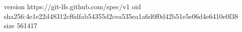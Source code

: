 version https://git-lfs.github.com/spec/v1
oid sha256:4e1e22d48312cf6dfab54355d2cea535ea1a6d0f0d42b51e5e06d4e6410e0f38
size 561417
